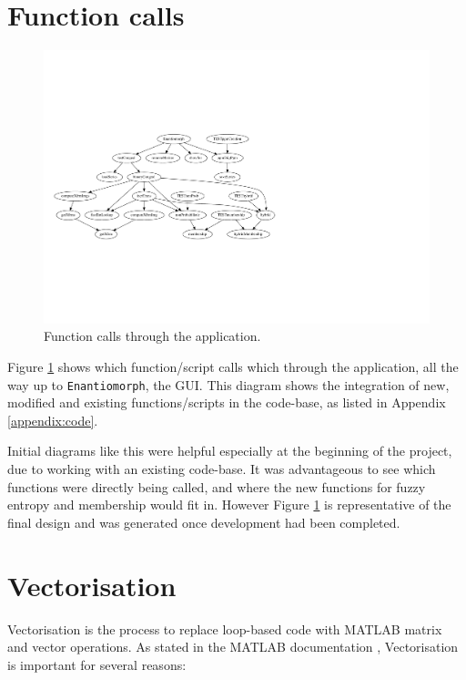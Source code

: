 \section{Function calls}

\begin{figure}[H]
  \centering
  \includegraphics[width=\textwidth,clip,trim=0mm 50mm 110mm 50mm]{Chapter2/software-img/function_call_1.pdf}
  \caption{Function calls through the application.}
  \label{fig:data-flow}
\end{figure}

Figure \ref{fig:data-flow} shows which function/script calls which through the application, all the way up to \texttt{Enantiomorph}, the \acrshort{GUI}. This diagram shows the integration of new, modified and existing functions/scripts in the code-base, as listed in Appendix \ref{appendix:code}.

Initial diagrams like this were helpful especially at the beginning of the project, due to working with an existing code-base. It was advantageous to see which functions were directly being called, and where the new functions for fuzzy entropy and membership would fit in. However Figure \ref{fig:data-flow} is representative of the final design and was generated once development had been completed.

\newpage
\section{Vectorisation}
\label{sec:vectorisation}

Vectorisation is the process to replace loop-based code with MATLAB matrix and vector operations. As stated in the MATLAB documentation \cite{vectorisation}, Vectorisation is important for several reasons:


